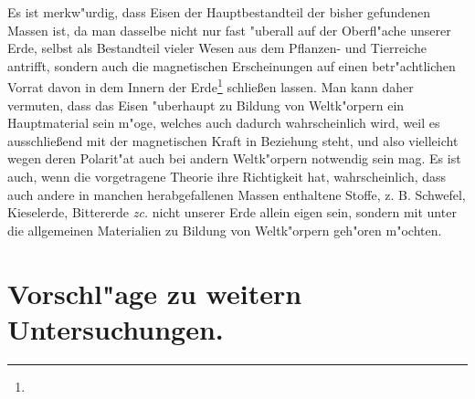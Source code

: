 \documentclass[a4paper, 11pt, oneside, polutonikogreek, german]{article}
\begin{document}
Es ist merkw"urdig, dass Eisen der Hauptbestandteil der bisher gefundenen Massen ist, da man dasselbe nicht nur fast "uberall auf der Oberfl"ache unserer Erde, selbst als Bestandteil vieler Wesen aus dem Pflanzen- und Tierreiche antrifft, sondern auch die magnetischen Erscheinungen auf einen betr"achtlichen Vorrat davon in dem Innern der Erde\footnote{} schließen lassen. Man kann daher vermuten, dass das Eisen "uberhaupt zu Bildung von Weltk"orpern ein Hauptmaterial sein m"oge, welches auch dadurch wahrscheinlich wird, weil es ausschließend mit der magnetischen Kraft in Beziehung steht, und also vielleicht wegen deren Polarit"at auch bei andern Weltk"orpern notwendig sein mag. Es ist auch, wenn die vorgetragene Theorie ihre Richtigkeit hat, wahrscheinlich, dass auch andere in manchen herabgefallenen Massen enthaltene Stoffe, z. B. Schwefel, Kieselerde, Bittererde \emph{zc.} nicht unserer Erde allein eigen sein, sondern mit unter die allgemeinen Materialien zu Bildung von Weltk"orpern geh"oren m"ochten.
\clearpage
\section{Vorschl"age zu weitern Untersuchungen.}
\end{document}
